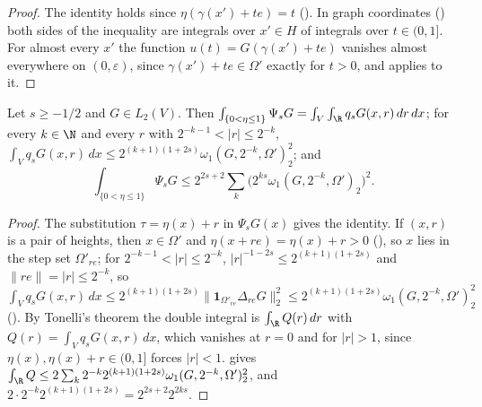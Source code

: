 \begin{proof}
\leanok
{}
The identity holds since $\eta(\gamma(x') + t e) = t$ (). In graph
coordinates () both sides of the inequality are integrals
over $x' \in H$ of integrals over $t \in (0, 1]$. For almost every $x'$ the function
$u(t) = G(\gamma(x') + t e)$ vanishes almost everywhere on $(0, \varepsilon)$, since
$\gamma(x') + t e \in \Omega'$ exactly for $t > 0$, and  applies to it.
\end{proof}

\begin{lemma}
\label{lem:vertical-form-moduli}
\leanok
{}
Let $s \geq -1/2$ and $G \in L_2(V)$. Then
$\int_{\{0 < \eta \leq 1\}} \Psi_s G = \int_V \int_\R q_s G(x, r) \, dr \, dx$; for every
$k \in \N$ and every $r$ with $2^{-k-1} < |r| \leq 2^{-k}$,
$\int_V q_s G(x, r) \, dx \leq 2^{(k+1)(1+2s)} \omega_1(G, 2^{-k}, \Omega')_2^2$; and
\[
  \int_{\{0 < \eta \leq 1\}} \Psi_s G
  \leq 2^{2s+2} \sum_k \bigl(2^{ks} \omega_1(G, 2^{-k}, \Omega')_2\bigr)^2 .
\]
\end{lemma}

\begin{proof}
\leanok
{}
The substitution $\tau = \eta(x) + r$ in $\Psi_s G(x)$ gives the identity. If
$(x, r)$ is a pair of heights, then $x \in \Omega'$ and $\eta(x + r e) = \eta(x) + r > 0$
(), so $x$ lies in the step set $\Omega'_{re}$; for
$2^{-k-1} < |r| \leq 2^{-k}$, $|r|^{-1-2s} \leq 2^{(k+1)(1+2s)}$ and $\|r e\| = |r| \leq 2^{-k}$,
so $\int_V q_s G(x, r) \, dx \leq 2^{(k+1)(1+2s)} \|\mathbf 1_{\Omega'_{re}} \Delta_{re} G\|_2^2
\leq 2^{(k+1)(1+2s)} \omega_1(G, 2^{-k}, \Omega')_2^2$ (). By Tonelli's
theorem the double integral is $\int_\R Q(r) \, dr$ with $Q(r) = \int_V q_s G(x, r) \, dx$, which
vanishes at $r = 0$ and for $|r| > 1$, since $\eta(x), \eta(x) + r \in (0, 1]$ forces $|r| < 1$.
 gives
$\int_\R Q \leq 2 \sum_k 2^{-k} 2^{(k+1)(1+2s)} \omega_1(G, 2^{-k}, \Omega')_2^2$, and
$2 \cdot 2^{-k} 2^{(k+1)(1+2s)} = 2^{2s+2} 2^{2ks}$.
\end{proof}

